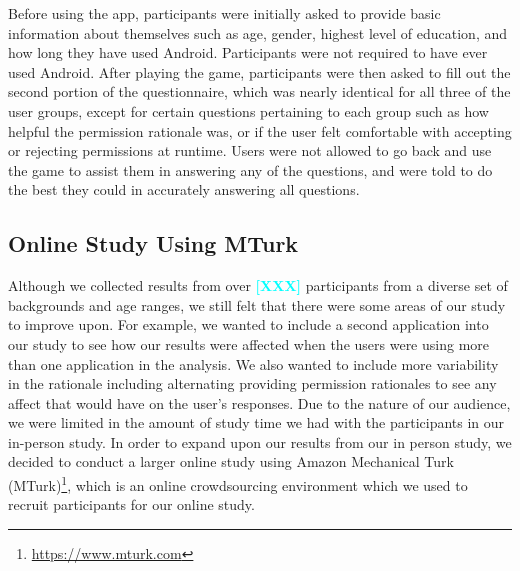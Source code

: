 \documentclass{sig-alternate-05-2015}
\newcommand{\todo}[1]{\textcolor{cyan}{\textbf{[#1]}}}
\begin{document}
Before using the app, participants were initially asked to provide basic information about themselves such as age, gender, highest level of education, and how long they have used Android. Participants were not required to have ever used Android. After playing the game, participants were then asked to fill out the second portion of the questionnaire, which was nearly identical for all three of the user groups, except for certain questions pertaining to each group such as how helpful the permission rationale was, or if the user felt comfortable with accepting or rejecting permissions at runtime. Users were not allowed to go back and use the game to assist them in answering any of the questions, and were told to do the best they could in accurately answering all questions.




\subsection{Online Study Using MTurk}






Although we collected results from over \todo{XXX} participants from a diverse set of backgrounds and age ranges, we still felt that there were some areas of our study to improve upon. For example, we wanted to include a second application into our study to see how our results were affected when the users were using more than one application in the analysis. We also wanted to include more variability in the rationale including alternating providing permission rationales to see any affect that would have on the user's responses. Due to the nature of our audience, we were limited in the amount of study time we had with the participants in our in-person study. In order to expand upon our results from our in person study, we decided to conduct a larger online study using Amazon Mechanical Turk (MTurk)\footnote{\url{https://www.mturk.com}}, which is an online crowdsourcing environment which we used to recruit participants for our online study.




%


\end{document}
